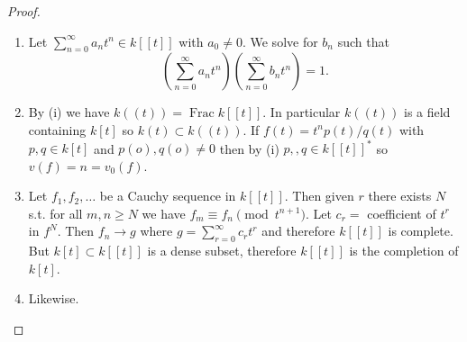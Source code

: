 \documentclass[10pt,]{book}
\theoremstyle{plain}
\theoremstyle{definition}
\DeclareMathOperator{\Frac}{Frac}
\begin{document}
\begin{proof}
\begin{enumerate}
\item{}
                Let \(\sum_{n=0}^\infty a_n t^n\in k[[t]]\) with \(a_0 \ne 0\).
                We solve for \(b_n\) such that \[\left(\sum_{n=0}^\infty a_n t^n\right)\left(\sum_{n=0}^\infty b_n t^n\right) = 1.\]
              \item{}
                By (i) we have \(k((t)) = \Frac k[[t]]\).
                In particular \(k((t))\) is a field containing \(k[t]\) so \(k(t) \subset k((t))\).
                If \(f(t) = t^n p(t)/q(t)\) with \(p,q\in k[t]\) and \(p(o),q(o) \ne 0\) then by (i) \(p,,q \in k[[t]]^*\) so \(v(f) = n  = v_0 (f)\).
              \item{}
                Let \(f_1,f_2,\ldots\) be a Cauchy sequence in \(k[[t]]\).
                Then given \(r\) there exists \(N\) s.t. for all \(m,n \ge N\) we have \(f_m \equiv f_n \pmod{t^{n+1}}\).
                Let \(c_r  = \) coefficient of \(t^r\) in \(f^N\).
                Then \(f_n \to g\) where \(g = \sum_{r=0}^\infty c_r t^r\) and therefore \(k[[t]]\) is complete.
                But \(k[t] \subset k[[t]]\) is a dense subset, therefore \(k[[t]]\) is the completion of \(k[t]\).
              \item{}
                Likewise.
              \end{enumerate}
\end{proof}
\typeout{************************************************}
\typeout{************************************************}
\end{document}
